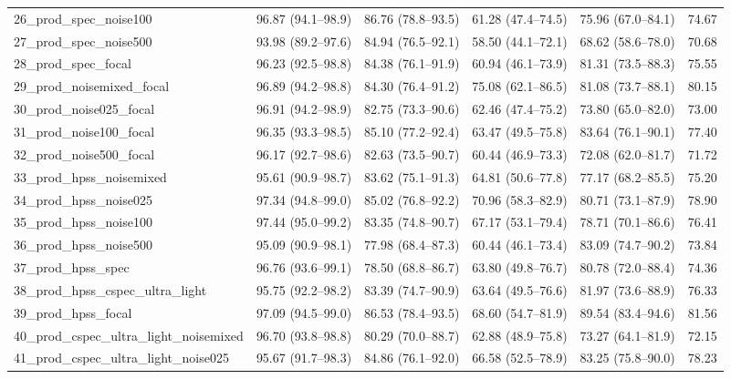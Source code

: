 \documentclass[10pt]{article}
\begin{document}
\begin{longtable}{lccccr}
26\_prod\_spec\_noise100 & 96.87 (94.1--98.9) & 86.76 (78.8--93.5) & 61.28 (47.4--74.5) & 75.96 (67.0--84.1) & 74.67 \\
27\_prod\_spec\_noise500 & 93.98 (89.2--97.6) & 84.94 (76.5--92.1) & 58.50 (44.1--72.1) & 68.62 (58.6--78.0) & 70.68 \\
28\_prod\_spec\_focal & 96.23 (92.5--98.8) & 84.38 (76.1--91.9) & 60.94 (46.1--73.9) & 81.31 (73.5--88.3) & 75.55 \\
29\_prod\_noisemixed\_focal & 96.89 (94.2--98.8) & 84.30 (76.4--91.2) & 75.08 (62.1--86.5) & 81.08 (73.7--88.1) & 80.15 \\
30\_prod\_noise025\_focal & 96.91 (94.2--98.9) & 82.75 (73.3--90.6) & 62.46 (47.4--75.2) & 73.80 (65.0--82.0) & 73.00 \\
31\_prod\_noise100\_focal & 96.35 (93.3--98.5) & 85.10 (77.2--92.4) & 63.47 (49.5--75.8) & 83.64 (76.1--90.1) & 77.40 \\
32\_prod\_noise500\_focal & 96.17 (92.7--98.6) & 82.63 (73.5--90.7) & 60.44 (46.9--73.3) & 72.08 (62.0--81.7) & 71.72 \\
33\_prod\_hpss\_noisemixed & 95.61 (90.9--98.7) & 83.62 (75.1--91.3) & 64.81 (50.6--77.8) & 77.17 (68.2--85.5) & 75.20 \\
34\_prod\_hpss\_noise025 & 97.34 (94.8--99.0) & 85.02 (76.8--92.2) & 70.96 (58.3--82.9) & 80.71 (73.1--87.9) & 78.90 \\
35\_prod\_hpss\_noise100 & 97.44 (95.0--99.2) & 83.35 (74.8--90.7) & 67.17 (53.1--79.4) & 78.71 (70.1--86.6) & 76.41 \\
36\_prod\_hpss\_noise500 & 95.09 (90.9--98.1) & 77.98 (68.4--87.3) & 60.44 (46.1--73.4) & 83.09 (74.7--90.2) & 73.84 \\
37\_prod\_hpss\_spec & 96.76 (93.6--99.1) & 78.50 (68.8--86.7) & 63.80 (49.8--76.7) & 80.78 (72.0--88.4) & 74.36 \\
38\_prod\_hpss\_cspec\_ultra\_light & 95.75 (92.2--98.2) & 83.39 (74.7--90.9) & 63.64 (49.5--76.6) & 81.97 (73.6--88.9) & 76.33 \\
39\_prod\_hpss\_focal & 97.09 (94.5--99.0) & 86.53 (78.4--93.5) & 68.60 (54.7--81.9) & 89.54 (83.4--94.6) & 81.56 \\
40\_prod\_cspec\_ultra\_light\_noisemixed & 96.70 (93.8--98.8) & 80.29 (70.0--88.7) & 62.88 (48.9--75.8) & 73.27 (64.1--81.9) & 72.15 \\
41\_prod\_cspec\_ultra\_light\_noise025 & 95.67 (91.7--98.3) & 84.86 (76.1--92.0) & 66.58 (52.5--78.9) & 83.25 (75.8--90.0) & 78.23 \\

\end{longtable}
\end{document}

